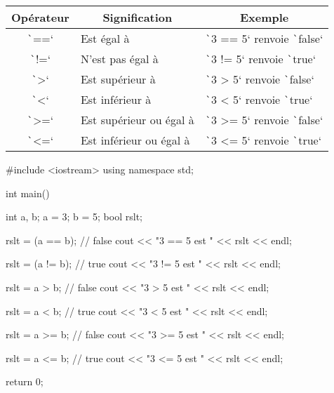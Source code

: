 \documentclass[10pt]{article}
\begin{document}
\begin{table}[H]
    \centering
    \begin{tabular}{|c|l|l|}
    \hline
    \textbf{Opérateur}    & \multicolumn{1}{c|}{\textbf{Signification}} & \multicolumn{1}{c|}{\textbf{Exemple}} \\ \hline
    \texttt`==`  & Est égal à                                  & \texttt`3 == 5` renvoie \texttt`false` \\ \hline
    \texttt`!=`  & N'est pas égal à                            & \texttt`3 != 5`  renvoie \texttt`true` \\ \hline
    \texttt`>`   & Est supérieur à                             & \texttt`3 > 5`  renvoie \texttt`false` \\ \hline
    \texttt`<`   & Est inférieur à                             & \texttt`3 < 5`  renvoie \texttt`true`  \\ \hline
    \texttt`>=`  & Est supérieur ou égal à                     & \texttt`3 >= 5`  renvoie \texttt`false` \\ \hline
    \texttt`<=`  & Est inférieur ou égal à                     & \texttt`3 <= 5`  renvoie \texttt`true` \\ \hline
    \end{tabular}
\end{table}

\begin{cppcode}
    #include <iostream>
    using namespace std;

    int main() {
        int a, b;
        a = 3;
        b = 5;
        bool rslt;

        rslt = (a == b);   // false
        cout << "3 == 5 est " << rslt << endl;

        rslt = (a != b);  // true
        cout << "3 != 5 est " << rslt << endl;

        rslt = a > b;   // false
        cout << "3 > 5 est " << rslt << endl;

        rslt = a < b;   // true
        cout << "3 < 5 est " << rslt << endl;

        rslt = a >= b;  // false
        cout << "3 >= 5 est " << rslt << endl;

        rslt = a <= b;  // true
        cout << "3 <= 5 est " << rslt << endl;

        return 0;
}
\end{cppcode}
\caption{Exemple 3 : Opérateurs relationnels}
\end{document}
